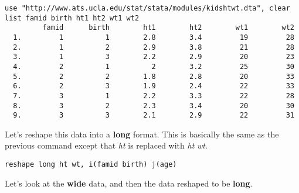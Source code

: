 \begin{lstlisting}
use "http://www.ats.ucla.edu/stat/stata/modules/kidshtwt.dta", clear
list famid birth ht1 ht2 wt1 wt2
         famid      birth        ht1        ht2        wt1        wt2
  1.         1          1        2.8        3.4         19         28
  2.         1          2        2.9        3.8         21         28
  3.         1          3        2.2        2.9         20         23
  4.         2          1          2        3.2         25         30
  5.         2          2        1.8        2.8         20         33
  6.         2          3        1.9        2.4         22         33
  7.         3          1        2.2        3.3         22         28
  8.         3          2        2.3        3.4         20         30
  9.         3          3        2.1        2.9         22         31
\end{lstlisting}

Let's reshape this data into a \textbf{long} format. This is basically the same as the previous command except that \textit{ht} is replaced with \textit{ht} \textit{wt}.

\begin{lstlisting}
reshape long ht wt, i(famid birth) j(age)
\end{lstlisting}

Let's look at the \textbf{wide} data, and then the data reshaped to be \textbf{long}.

